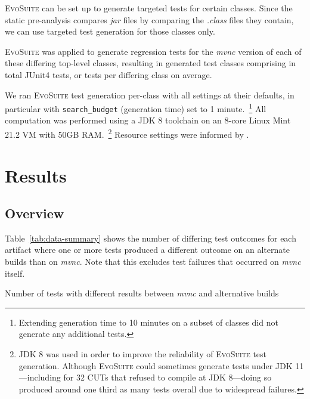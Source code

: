 \documentclass[conference]{IEEEtran}
\makeatletter
\newcommand{\evosuite}{\textsc{EvoSuite}\@\xspace}
\newcommand{\inputgen}[1]{\unskip}
\makeatother
\begin{document}
\evosuite can be set up to generate targeted tests for certain classes. Since the static pre-analysis compares \textit{jar} files by comparing the \textit{.class} files they contain, we can use targeted test generation for those classes only.   

\evosuite was applied to generate regression tests for the \textit{mvnc} version of each of these \inputgen{num-top-level-class-pairs-after-invokevirtual-invokeinterface} differing top-level classes, resulting in \inputgen{num-classes-with-generated-tests} generated test classes comprising in total \inputgen{num-generated-tests} JUnit4 tests, or \inputgen{avg-tests-per-class} tests per differing class on average.

We ran \evosuite test generation per-class with all settings at their defaults, in particular with \texttt{search\_budget} (generation time) set to 1 minute.~\footnote{Extending generation time to 10 minutes on a subset of classes did not generate any additional tests.}
All computation was performed using a JDK 8 toolchain on an 8-core Linux Mint 21.2 VM with 50GB RAM.~\footnote{JDK 8 was used in order to improve the reliability of \evosuite test generation. Although \evosuite could sometimes generate tests under JDK 11---including for 32 CUTs that refused to compile at JDK 8---doing so produced around one third as many tests overall due to widespread failures.}
Resource settings were informed by \cite{jahangirova2023sbft}. 


\section{Results}
\label{sec:results}

\subsection{Overview}

Table~\ref{tab:data-summary} shows the number of differing test outcomes for each artifact where one or more tests produced a different outcome on an alternate builds than on \textit{mvnc}.
Note that this excludes \inputgen{num-test-failures-on-mvnc} test failures that occurred on \textit{mvnc} itself.

\begin{table}[h]
	\centering
	\inputgen{data-summary-table-tabular}
	\caption{Number of tests with different results between \textit{mvnc} and alternative builds}
	\label{tab:data-summary}
\end{table}
\end{document}
